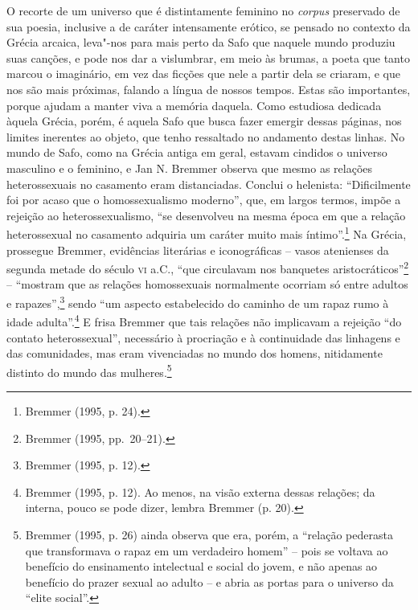 O recorte de um universo que é distintamente feminino no \textit{corpus} preservado de sua poesia, inclusive
a de caráter intensamente erótico, se pensado no contexto da Grécia arcaica, leva"-nos para mais perto da Safo que naquele mundo produziu suas canções, e pode nos dar a vislumbrar, em meio às brumas, a poeta que tanto marcou o imaginário, em vez das ficções que nele a partir dela se criaram, e que nos são mais próximas, falando a língua de nossos tempos. Estas são importantes, porque ajudam a manter viva a memória daquela. Como estudiosa dedicada àquela Grécia, porém, é aquela Safo que busca fazer emergir dessas páginas, nos limites inerentes ao objeto, que tenho ressaltado no andamento destas linhas. No mundo
de Safo, como na Grécia antiga em geral, estavam cindidos o universo masculino
e o feminino, e Jan N. Bremmer observa que mesmo as relações
heterossexuais no casamento eram distanciadas. Conclui o helenista:
“Dificilmente foi por acaso que o homossexualismo moderno”, que, em largos termos, impõe
a rejeição ao heterossexualismo, “se desenvolveu na mesma época em que a
relação heterossexual no casamento adquiria um caráter muito mais íntimo”.\footnote{ Bremmer (1995, p. 24).} Na
Grécia, prossegue Bremmer, evidências literárias e iconográficas -- vasos
atenienses da segunda metade do século \textsc{vi} a.C., “que circulavam nos banquetes
aristocráticos”\footnote{ Bremmer (1995, pp.~20--21).} -- “mostram que as relações homossexuais normalmente
ocorriam só entre adultos e rapazes”,\footnote{ Bremmer (1995, p. 12).} sendo “um aspecto estabelecido do
caminho de um rapaz rumo à idade adulta”.\footnote{ Bremmer (1995, p. 12). Ao menos, na visão
externa dessas relações; da interna, pouco se pode dizer, lembra Bremmer (p.
20).} E frisa Bremmer que tais relações não implicavam a rejeição “do contato
heterossexual”, necessário à procriação e à continuidade das linhagens e das
comunidades, mas eram vivenciadas no mundo dos homens, nitidamente distinto do
mundo das mulheres.\footnote{ Bremmer (1995, p. 26) ainda observa que era,
porém, a “relação pederasta que transformava o rapaz em um verdadeiro homem” --
pois se voltava ao benefício do ensinamento intelectual e social do jovem, e
não apenas ao benefício do prazer sexual ao adulto -- e abria as portas para o
universo da “elite social”.}

